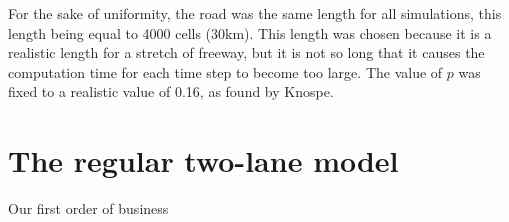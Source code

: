 \documentclass[11pt]{article}
\begin{document}
	For the sake of uniformity, the road was the same length for all simulations, this length being equal to 4000 cells (30km). This length was chosen because it is a realistic length for a stretch of freeway, but it is not so long that it causes the computation time for each time step to become too large. The value of $p$ was fixed to a realistic value of 0.16, as found by Knospe\cite{duepublico_mods_00005368}. \\
	
	\section{The regular two-lane model} \label{sec:regularNaSch}
	
	Our first order of business 
	
	\newpage
	
	
	
	
\end{document}
